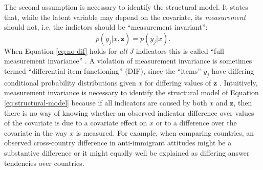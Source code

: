 \documentclass[letterpaper,12pt]{article}
\begin{document}
The second assumption is necessary to identify the structural model. It states that, while the latent variable may depend on the covariate, its \emph{measurement} should not, i.e. the indictors should be ``measurement invariant'':
\begin{equation}
	p(y_j | x, \mathbf{z}) = p(y_j | x).
	\label{eq:no-dif}
\end{equation}
When Equation \ref{eq:no-dif} holds for \emph{all} $J$ indicators this is called ``full measurement invariance'' \citep{meredith1993measurement}. 
A violation of  measurement invariance is sometimes termed ``differential item functioning'' (DIF), since the ``items'' $y_j$ have differing conditional probability distributions given $x$ for differing values of $\mathbf{z}$ \citep{mellenbergh1989item}.
Intuitively, measurement invariance is necessary to identify the structural model of Equation \ref{eq:structural-model} because if all indicators are caused by both $x$ and $\mathbf{z}$, then there is no way of knowing whether an observed indicator difference  over values of the covariate is due to a covariate effect on  $x$ or to a difference over the covariate in the way $x$ is measured. For example, when comparing countries, an observed cross-country difference in anti-immigrant attitudes might be a substantive difference or it might equally well be explained as differing answer tendencies over countries. 
\end{document}
